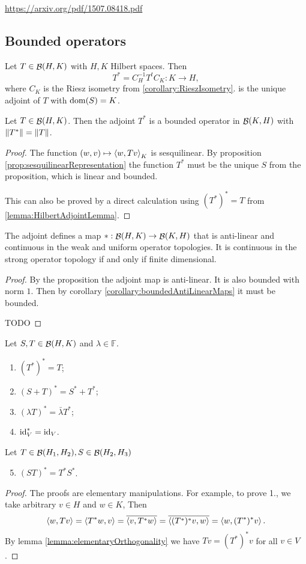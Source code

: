 \url{https://arxiv.org/pdf/1507.08418.pdf}

\subsection{Bounded operators}
\begin{proposition}
Let $T\in\mathop{\mathcal{B}}(H,K)$ with $H,K$ Hilbert spaces. Then
\[ T^* = C_H^{-1}T^tC_K: K\to H, \]
where $C_K$ is the Riesz isometry from \ref{corollary:RieszIsometry}.
is the unique adjoint of $T$ with $\operatorname{dom}(S) = K$.
\end{proposition}

\begin{lemma}
Let $T\in\mathop{\mathcal{B}}(H,K)$. Then the adjoint $T^*$ is a bounded operator in $\mathop{\mathcal{B}}(K,H)$ with $\lVert T^*\rVert = \lVert T\rVert$.
\end{lemma}
\begin{proof}
The function $(w,v)\mapsto \left\langle w,Tv \right\rangle_K$ is sesquilinear. By proposition \ref{prop:sesquilinearRepresentation} the function $T^*$ must be the unique $S$ from the proposition, which is linear and bounded.

This can also be proved by a direct calculation using $(T^*)^* = T$ from \ref{lemma:HilbertAdjointLemma}.
\end{proof}

\begin{lemma}
The adjoint defines a map $*:\mathop{\mathcal{B}}(H,K)\to \mathop{\mathcal{B}}(K,H)$ that is anti-linear and continuous in the weak and uniform operator topologies. It is continuous in the strong operator topology \textup{if and only if} finite dimensional.
\end{lemma}
\begin{proof}
By the proposition the adjoint map is anti-linear. It is also bounded with norm $1$. Then by corollary \ref{corollary:boundedAntiLinearMaps} it must be bounded.

TODO
\end{proof}

\begin{lemma} \label{lemma:HilbertAdjointLemma}
Let $S,T\in\mathop{\mathcal{B}}(H,K)$ and $\lambda \in \mathbb{F}$.
\begin{enumerate}
\item $(T^*)^* = T$;
\item $(S+T)^* = S^* + T^*$;
\item $(\lambda T)^* = \bar{\lambda}T^*$;
\item $\operatorname{id}_V^* = \operatorname{id}_V$.
\end{enumerate}
Let $T\in\mathop{\mathcal{B}}(H_1,H_2), S\in\mathop{\mathcal{B}}(H_2,H_3)$
\begin{enumerate}
\setcounter{enumi}{4}
\item $(ST)^* = T^*S^*$.
\end{enumerate}
\end{lemma}
\begin{proof}
The proofs are elementary manipulations. For example, to prove 1., we take arbitrary $v\in H$ and $w\in K$, Then
\[ \left\langle w,Tv \right\rangle = \left\langle T^*w,v \right\rangle = \overline{\left\langle v,T^*w \right\rangle} = \overline{\left\langle (T^*)^*v,w \right\rangle} = \left\langle w, (T^*)^*v \right\rangle. \]
By lemma \ref{lemma:elementaryOrthogonality} we have $Tv = (T^*)^*v$ for all $v\in V$. 
\end{proof}

